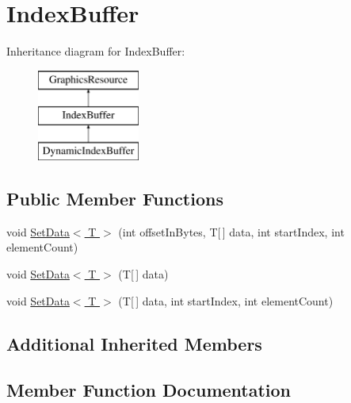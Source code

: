\hypertarget{classMicrosoft_1_1Xna_1_1Framework_1_1Graphics_1_1IndexBuffer}{}\section{Index\+Buffer}
\label{classMicrosoft_1_1Xna_1_1Framework_1_1Graphics_1_1IndexBuffer}
Inheritance diagram for Index\+Buffer\+:\begin{figure}[H]
\begin{center}
\leavevmode
\includegraphics[height=3.000000cm]{classMicrosoft_1_1Xna_1_1Framework_1_1Graphics_1_1IndexBuffer}
\end{center}
\end{figure}
\subsection*{Public Member Functions}
\begin{DoxyCompactItemize}
\item 
void \hyperlink{classMicrosoft_1_1Xna_1_1Framework_1_1Graphics_1_1IndexBuffer_a0631f2d15fe9dc597cb2f998cfb22058}{Set\+Data$<$ T $>$} (int offset\+In\+Bytes, T\mbox{[}$\,$\mbox{]} data, int start\+Index, int element\+Count)
\item 
void \hyperlink{classMicrosoft_1_1Xna_1_1Framework_1_1Graphics_1_1IndexBuffer_a10a0b42e0c9e2b22e3964dac486f321e}{Set\+Data$<$ T $>$} (T\mbox{[}$\,$\mbox{]} data)
\item 
void \hyperlink{classMicrosoft_1_1Xna_1_1Framework_1_1Graphics_1_1IndexBuffer_af72400eac2ea582c9a148d1932182bc7}{Set\+Data$<$ T $>$} (T\mbox{[}$\,$\mbox{]} data, int start\+Index, int element\+Count)
\end{DoxyCompactItemize}
\subsection*{Additional Inherited Members}


\subsection{Member Function Documentation}
\hypertarget{classMicrosoft_1_1Xna_1_1Framework_1_1Graphics_1_1IndexBuffer_a0631f2d15fe9dc597cb2f998cfb22058}{}
